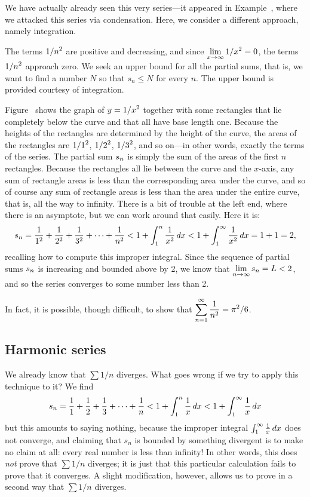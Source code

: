 \begin{solution}
  We have actually already seen this very series---it appeared in
  Example~, where we attacked this series
  via condensation.  Here, we consider a different approach, namely
  integration.

  The terms $\displaystyle 1/n^2$ are positive and decreasing, and since
  $\displaystyle\lim_{x\to\infty} 1/x^2=0$, the terms $\displaystyle 1/n^2$ approach
  zero. We seek an upper bound for all the partial sums, that is, we
  want to find a number $N$ so that $s_n\le N$ for every $n$. The
  upper bound is provided courtesy of integration.

  Figure~ shows the
  graph of $\displaystyle y=1/x^2$ together with some rectangles that lie
  completely below the curve and that all have base length
  one. Because the heights of the rectangles are determined by the
  height of the curve, the areas of the rectangles are $\displaystyle 1/1^2$,
  $\displaystyle 1/2^2$, $\displaystyle 1/3^2$, and so on---in other words, exactly the
  terms of the series. The partial sum $\displaystyle s_n$ is simply the sum of
  the areas of the first $n$ rectangles. Because the rectangles all
  lie between the curve and the $x$-axis, any sum of rectangle areas
  is less than the corresponding area under the curve, and so of
  course any sum of rectangle areas is less than the area under the
  entire curve, that is, all the way to infinity.  There is a bit of
  trouble at the left end, where there is an asymptote, but we can
  work around that easily. Here it is:
$$
  s_n={1\over 1^2}+{1\over 2^2}+{1\over 3^2}+\cdots+{1\over n^2}
  < 1 + \int_1^n {1\over x^2}\,dx < 1+\int_1^\infty {1\over x^2}\,dx 
  =1+1=2,
$$
recalling how to compute this improper integral. Since the sequence of partial
sums $\displaystyle s_n$ is increasing and bounded above by 2, we know that 
$\displaystyle\lim_{n\to\infty}s_n=L<2$, and so the series converges to some
number less than 2.
\end{solution}

In fact, it is possible, though difficult, to show that $\displaystyle
\sum_{n=1}^\infty \frac{1}{n^2} = \pi^2/6$.

\subsection{Harmonic series}

We already know that $\sum 1/n$ diverges. What goes wrong if we try to
apply this technique to it? We find
$$
  s_n={1\over 1}+{1\over 2}+{1\over 3}+\cdots+{1\over n}
  < 1 + \int_1^n {1\over x}\,dx < 1+\int_1^\infty {1\over x}\,dx 
$$
but this amounts to saying nothing, because the improper integral
$\int_1^\infty {1\over x}\,dx$ does not converge, and claiming that
$s_n$ is bounded by something divergent is to make no claim at all:
every real number is less than infinity!  In other words, this does
{\em not\/} prove that $\sum 1/n$ diverges; it is just that this
particular calculation fails to prove that it converges. A slight
modification, however, allows us to prove in a second way that $\sum
1/n$ diverges.

